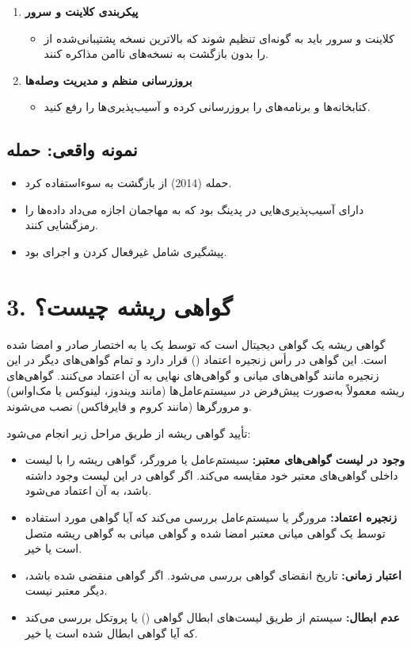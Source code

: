 \begin{enumerate}
    \item \textbf{پیکربندی کلاینت و سرور}
        \begin{itemize}
            \item کلاینت و سرور باید به گونه‌ای تنظیم شوند که بالاترین نسخه پشتیبانی‌شده از  را بدون بازگشت به نسخه‌های ناامن مذاکره کنند.
        \end{itemize}

    \item \textbf{بروزرسانی منظم و مدیریت وصله‌ها}
        \begin{itemize}
            \item کتابخانه‌ها و برنامه‌های  را بروزرسانی کرده و آسیب‌پذیری‌ها را رفع کنید.
        \end{itemize}
\end{enumerate}

\subsection*{نمونه واقعی: حمله }
\begin{itemize}
    \item حمله  (2014) از بازگشت به  سوءاستفاده کرد.
    \item {} دارای آسیب‌پذیری‌هایی در پدینگ بود که به مهاجمان اجازه می‌داد داده‌ها را رمزگشایی کنند.
    \item پیشگیری شامل غیرفعال کردن  و اجرای  بود.
\end{itemize}


\section*{3. گواهی ریشه چیست؟}
گواهی ریشه یک گواهی دیجیتال است که توسط یک  یا به اختصار  صادر و امضا شده است. این گواهی در رأس زنجیره اعتماد () قرار دارد و تمام گواهی‌های دیگر در این زنجیره مانند گواهی‌های میانی و گواهی‌های نهایی به آن اعتماد می‌کنند. گواهی‌های ریشه معمولاً به‌صورت پیش‌فرض در سیستم‌عامل‌ها (مانند ویندوز، لینوکس یا مک‌اواس) و مرورگرها (مانند کروم و فایرفاکس) نصب می‌شوند.

تأیید گواهی ریشه از طریق مراحل زیر انجام می‌شود:
\begin{itemize}
    \item \textbf{وجود در لیست گواهی‌های معتبر:} سیستم‌عامل یا مرورگر، گواهی ریشه را با لیست داخلی گواهی‌های معتبر خود مقایسه می‌کند. اگر گواهی در این لیست وجود داشته باشد، به آن اعتماد می‌شود.
    \item \textbf{زنجیره اعتماد:} مرورگر یا سیستم‌عامل بررسی می‌کند که آیا گواهی مورد استفاده توسط یک گواهی میانی معتبر امضا شده و گواهی میانی به گواهی ریشه متصل است یا خیر.
    \item \textbf{اعتبار زمانی:} تاریخ انقضای گواهی بررسی می‌شود. اگر گواهی منقضی شده باشد، دیگر معتبر نیست.
    \item \textbf{عدم ابطال:} سیستم از طریق لیست‌های ابطال گواهی () یا پروتکل  بررسی می‌کند که آیا گواهی ابطال شده است یا خیر.
\end{itemize}

